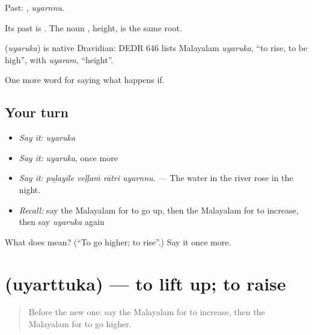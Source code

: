 Past: , \emph{uyarnnu}.

Its past is . The noun , height, is the same root.

\begin{cousinweb}
\textbf{} (\emph{uyaruka}) is native Dravidian: DEDR 646 lists Malayalam \emph{uyaruka}, \textquotedblleft{}to rise, to be high\textquotedblright{}, with \emph{uyaram}, \textquotedblleft{}height\textquotedblright{}.
\end{cousinweb}

\begin{grammarlens}[title={What you've built}]
One more word for saying what happens if.
\end{grammarlens}

\subsection*{Your turn}
\begin{itemize}
\raggedright
  \item \emph{Say it:} \emph{uyaruka}
  \item \emph{Say it:} \emph{uyaruka}, once more
  \item \emph{Say it:} \emph{puḻayile veḷḷaṁ rātri uyarnnu.} — The water in the river rose in the night.
  \item \emph{Recall:} say the Malayalam for to go up, then the Malayalam for to increase, then say \emph{uyaruka} again
\end{itemize}

\begin{tcolorbox}[breakable,colback=teal!4,colframe=teal!35!black,title={Before you move on}]
What does  mean? (\textquotedblleft{}To go higher; to rise\textquotedblright{}.) Say it once more.
\end{tcolorbox}
\section[\texorpdfstring{\ml{ഉയർത്തുക} (uyarttuka)}{ഉയർത്തുക (uyarttuka)}]{ (uyarttuka) — to lift up; to raise}

\label{lesson:ML-C449-uyarttuka}



\begin{quote}
Before the new one: say the Malayalam for to increase, then the Malayalam for to go higher.
\end{quote}

